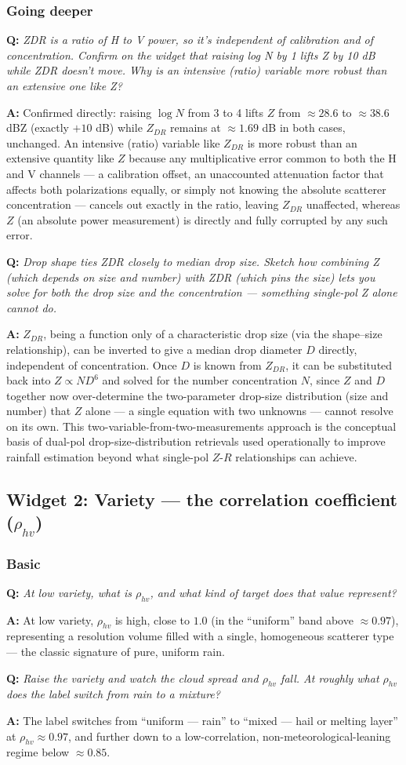 \documentclass[11pt]{article}
\newenvironment{qa}[1]{\par\noindent\textbf{\color{qgray}Q: }\emph{#1}\par\noindent\textbf{A: }}{\par\vspace{6pt}}
\newcommand{\tier}[1]{\subsubsection*{#1}}
\begin{document}
\tier{Going deeper}
\begin{qa}{ZDR is a ratio of H to V power, so it's independent of calibration and of concentration. Confirm on the widget that raising log N by 1 lifts Z by 10 dB while ZDR doesn't move. Why is an intensive (ratio) variable more robust than an extensive one like Z?}
Confirmed directly: raising $\log N$ from 3 to 4 lifts $Z$ from $\approx28.6$ to $\approx38.6$ dBZ (exactly $+10$ dB) while $Z_{DR}$ remains at $\approx1.69$ dB in both cases, unchanged. An intensive (ratio) variable like $Z_{DR}$ is more robust than an extensive quantity like $Z$ because any multiplicative error common to both the H and V channels --- a calibration offset, an unaccounted attenuation factor that affects both polarizations equally, or simply not knowing the absolute scatterer concentration --- cancels out exactly in the ratio, leaving $Z_{DR}$ unaffected, whereas $Z$ (an absolute power measurement) is directly and fully corrupted by any such error.
\end{qa}
\begin{qa}{Drop shape ties ZDR closely to median drop size. Sketch how combining Z (which depends on size \emph{and} number) with ZDR (which pins the size) lets you solve for both the drop size and the concentration --- something single-pol Z alone cannot do.}
$Z_{DR}$, being a function only of a characteristic drop size (via the shape--size relationship), can be inverted to give a median drop diameter $D$ directly, independent of concentration. Once $D$ is known from $Z_{DR}$, it can be substituted back into $Z\propto N D^6$ and solved for the number concentration $N$, since $Z$ and $D$ together now over-determine the two-parameter drop-size distribution (size and number) that $Z$ alone --- a single equation with two unknowns --- cannot resolve on its own. This two-variable-from-two-measurements approach is the conceptual basis of dual-pol drop-size-distribution retrievals used operationally to improve rainfall estimation beyond what single-pol $Z$-$R$ relationships can achieve.
\end{qa}

\subsection{Widget 2: Variety --- the correlation coefficient ($\rho_{hv}$)}

\tier{Basic}
\begin{qa}{At low variety, what is $\rho_{hv}$, and what kind of target does that value represent?}
At low variety, $\rho_{hv}$ is high, close to $1.0$ (in the ``uniform'' band above $\approx0.97$), representing a resolution volume filled with a single, homogeneous scatterer type --- the classic signature of pure, uniform rain.
\end{qa}
\begin{qa}{Raise the variety and watch the cloud spread and $\rho_{hv}$ fall. At roughly what $\rho_{hv}$ does the label switch from rain to a mixture?}
The label switches from ``uniform --- rain'' to ``mixed --- hail or melting layer'' at $\rho_{hv}\approx0.97$, and further down to a low-correlation, non-meteorological-leaning regime below $\approx0.85$.
\end{qa}
\end{document}
